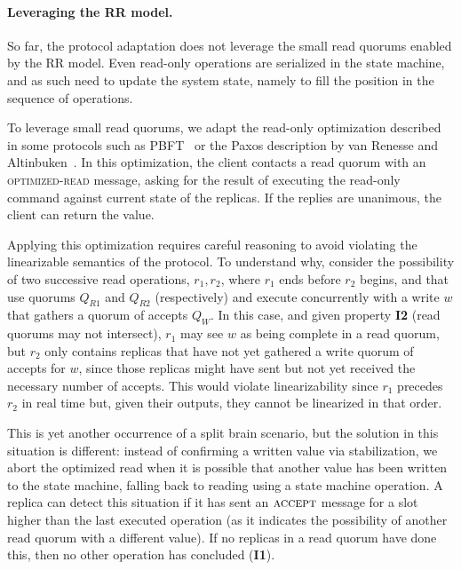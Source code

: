 \paragraph{Leveraging the \ac{RR} model.}
So far, the protocol adaptation does not leverage the
small read quorums enabled by the \ac{RR} model. Even
read-only operations are serialized in the state machine, and as
such need to update the system state, namely to fill the position
in the sequence of operations.

To leverage small read quorums, we adapt the read-only
optimization described in some protocols such as PBFT~\cite{pbft} or
the Paxos description by van Renesse and Altinbuken~\cite{pmmc}.  In
this optimization, the client contacts a read quorum with an
\textsc{optimized-read} message, asking for the
result of executing the read-only command against current state of the
replicas. If the replies are unanimous, the client can return the
value.

Applying this optimization requires careful reasoning to avoid
violating the linearizable semantics of the protocol. To
understand why, consider the possibility of two successive read
operations, $r_1, r_2$, where $r_1$ ends before $r_2$ begins, and
that use quorums $Q_{R1}$ and $Q_{R2}$ (respectively) and execute
concurrently with a write $w$ that gathers a quorum of accepts
$Q_W$. In this case, and given property \textbf{I2} (read quorums
may not intersect), $r_1$ may see $w$ as being complete in a read
quorum, but $r_2$ only contains replicas that have not yet
gathered a write quorum of accepts for $w$, since those replicas
might have sent but not yet received the necessary number of
accepts. This would violate linearizability since $r_1$ precedes
$r_2$ in real time but, given their outputs, they cannot be
linearized in that order.

This is yet another occurrence of a split brain scenario, but
the solution in this situation is different: instead of
confirming a written value via stabilization, we abort the
optimized read when it is possible that another value has been
written to the state machine, falling back to reading using a
state machine operation. A replica can detect this situation if
it has sent an $\textsc{accept}$ message for a slot
higher than the last executed operation (as it indicates the
possibility of another read quorum with a different value). If no
replicas in a read quorum have done this, then no other operation
has concluded (\textbf{I1}).

